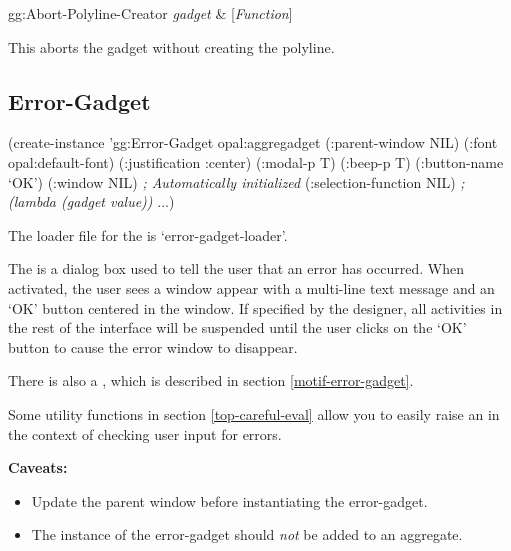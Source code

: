 \begin{programexample}
gg:Abort-Polyline-Creator {\it gadget} & [{\it Function}]
\end{programexample}
This aborts the gadget without creating the polyline.



\begin{group}
\section{Error-Gadget}
\label{error-gadget}
\begin{center}
\end{center}
\end{group}

\begin{group}
\begin{programexample}
(create-instance 'gg:Error-Gadget opal:aggregadget
   (:parent-window NIL)
   (:font opal:default-font)
   (:justification :center)
   (:modal-p T)
   (:beep-p T)
   (:button-name `OK')
   (:window NIL)               {\it ; Automatically initialized}
   (:selection-function NIL)   {\it ; (lambda (gadget value))}
   ...)
\end{programexample}
\end{group}

The loader file for the  is `error-gadget-loader'.

The  is a dialog box used to tell the user that an
error has occurred.  When activated, the user sees a window appear
with a multi-line text message and an `OK' button centered in the
window.  If specified by the designer, all activities in the rest of
the interface will be suspended until the user clicks on the `OK'
button to cause the error window to disappear.

There is also a , which is described in section
\ref{motif-error-gadget}.

Some utility functions in section \ref{top-careful-eval} allow you to easily
raise an  in the context of checking user input for errors.

{\bf Caveats:
\begin{itemize}
\item Update the parent window before instantiating the error-gadget.

\item The instance of the error-gadget should {\it not} be added to an aggregate.
\end{itemize}}


